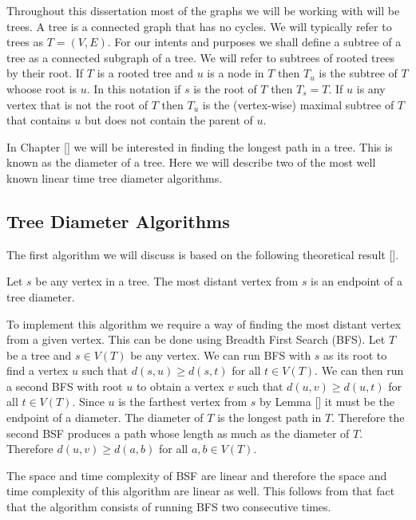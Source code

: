 Throughout this dissertation most of the graphs we will be working with will be trees. A tree is a connected graph that has no cycles. We will typically refer to trees as $T = (V, E)$. For our intents and purposes we shall define a subtree of a tree as a connected subgraph of a tree. We will refer to subtrees of rooted trees by their root. If $T$ is a rooted tree and $u$ is a node in $T$ then $T_u$ is the subtree of $T$ whoose root is $u$. In this notation if $s$ is the root of $T$ then $T_s = T$. If $u$ is any vertex that is not the root of $T$ then $T_u$ is the (vertex-wise) maximal subtree of $T$ that contains $u$ but does not contain the parent of $u$.


In Chapter [] we will be interested in finding the longest path in a tree. This is known as the diameter of a tree. Here we will  describe two of the most well known linear time tree diameter algorithms.

\subsection{Tree Diameter Algorithms}

The first algorithm we will discuss is based on the following theoretical result [].

\begin{lem} Let $s$ be any vertex in a tree. The most distant vertex from $s$ is an endpoint of a tree diameter. \end{lem}

To implement this algorithm we require a way of finding the most distant vertex from a given vertex. This can be done using Breadth First Search (BFS). Let $T$ be a tree and $s \in V(T)$ be any vertex. We can run BFS with $s$ as its root to find a vertex $u$ such that $d(s, u) \ge d(s, t)$ for all $t \in V(T)$. We can then run a second BFS with root $u$ to obtain a vertex $v$ such that $d(u, v) \ge d(u, t)$ for all $t \in V(T)$. Since $u$ is the farthest vertex from $s$ by Lemma [] it must be the endpoint of a diameter. The diameter of $T$ is the longest path in $T$. Therefore the second BSF produces a path whose length as much as the diameter of $T$. Therefore $d(u, v) \ge d(a, b)$ for all $a,b \in V(T)$.

The space and time complexity of BSF are linear \cite{intro-to-algo} and therefore the space and time complexity of this algorithm are linear as well. This follows from that fact that the algorithm consists of running BFS two consecutive times.

